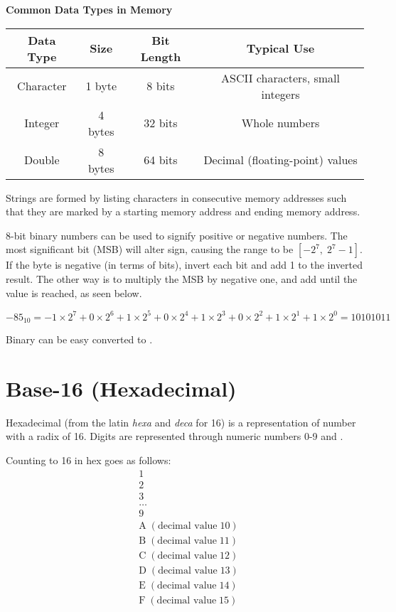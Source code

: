 \textbf{Common Data Types in Memory}

\begin{center}
  
  \begin{tabular}{|c|c|c|c|}
  \hline
  \textbf{Data Type} & \textbf{Size} & \textbf{Bit Length} & \textbf{Typical Use} \\
  \hline
  Character & 1 byte & 8 bits & ASCII characters, small integers \\
  \hline
  Integer & 4 bytes & 32 bits & Whole numbers \\
  \hline
  Double & 8 bytes & 64 bits & Decimal (floating-point) values \\
  \hline
  \end{tabular}
\end{center}


Strings are formed by listing characters in consecutive memory addresses such that they are marked by a starting memory address and ending memory address. 

8-bit binary numbers can be used to signify positive or negative numbers.  
The most significant bit (MSB) will alter sign, causing the range to be $[-2^{7}, \; 2^{7}-1]$. If the byte is negative (in terms of bits), invert each bit and add 1 to the inverted result. The other way is to multiply the MSB by negative one, and add until the value is reached, as seen below. 

\[
-85_{10} = -1 \times 2^7 + 0 \times 2^6 + 1 \times 2^5 + 0 \times 2^4 + 1 \times 2^3 + 0 \times 2^2 + 1 \times 2^1 + 1 \times 2^0 = 1010 1011
\]

Binary can be easy converted to . 

\section{Base-16 (Hexadecimal)}
Hexadecimal (from the latin \emph{hexa} and \emph{deca} for 16) is a representation of number with a radix of 16. Digits are represented through numeric numbers 0-9 and . 

Counting to 16 in hex goes as follows:
\begin{align*}
  &1 \\
  &2 \\
  &3 \\
  &\dots \\
  &9 \\
  &\text{A} \; (\text{decimal value} \;  10) \\
  &\text{B} \; (\text{decimal value} \; 11) \\
  &\text{C} \; (\text{decimal value} \; 12) \\
  &\text{D} \; (\text{decimal value} \; 13) \\
  &\text{E} \; (\text{decimal value} \; 14) \\
  &\text{F} \; (\text{decimal value} \; 15)
\end{align*}

